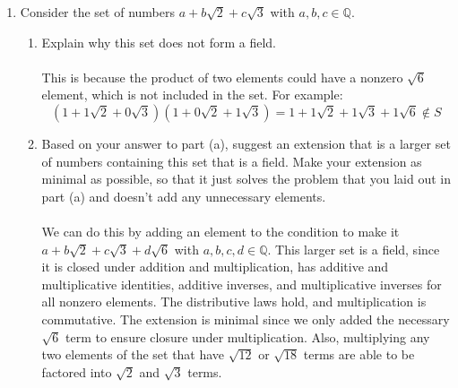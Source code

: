\documentclass{article}
\newcommand{\Q}{\mathbb{Q}}
\begin{document}
\begin{enumerate}
        \[\begin{pmatrix}
1&1\\0&1\end{pmatrix}\begin{pmatrix}1&0\\1&1\end{pmatrix} = \begin{pmatrix}2&1\\1&1\end{pmatrix} \neq \begin{pmatrix}1&0\\1&1\end{pmatrix}\begin{pmatrix}1&1\\0&1\end{pmatrix} = \begin{pmatrix}1&1\\1&2
        \end{pmatrix}\]
        \item Consider the set of numbers $a + b\sqrt{2} + c\sqrt{3}$ with $a,b,c \in \Q$.
        \begin{enumerate}
            \item Explain why this set does not form a field.
            \\
            \\ This is because the product of two elements could have a nonzero $\sqrt{6}$ element, which is not included in the set. For example:
            \[(1 + 1\sqrt{2} + 0\sqrt{3})(1 + 0\sqrt{2} + 1\sqrt{3}) = 1 + 1\sqrt{2} + 1\sqrt{3} + 1\sqrt{6} \notin S\]
            \item Based on your answer to part (a), suggest an extension that is a larger set of numbers containing this set that is a field. Make your extension as minimal as possible, so that it just solves the problem that you laid out in part (a) and doesn't add any unnecessary elements.
            \\
            \\We can do this by adding an element to the condition to make it $ a + b\sqrt2 + c\sqrt3 + d\sqrt6$ with $a,b,c,d \in \Q$. This larger set is a field, since it is closed under addition and multiplication, has additive and multiplicative identities, additive inverses, and multiplicative inverses for all nonzero elements. The distributive laws hold, and multiplication is commutative. The extension is minimal since we only added the necessary $\sqrt{6}$ term to ensure closure under multiplication. Also, multiplying any two elements of the set that have $\sqrt{12}$ or $\sqrt{18}$ terms are able to be factored into $\sqrt{2}$ and $\sqrt{3}$ terms.

\end{enumerate}
\end{enumerate}
\end{document}
